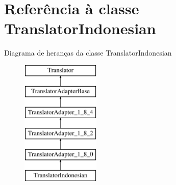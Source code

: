 \hypertarget{class_translator_indonesian}{\section{Referência à classe Translator\-Indonesian}
\label{class_translator_indonesian}
}
Diagrama de heranças da classe Translator\-Indonesian\begin{figure}[H]
\begin{center}
\leavevmode
\includegraphics[height=6.000000cm]{class_translator_indonesian}
\end{center}
\end{figure}

